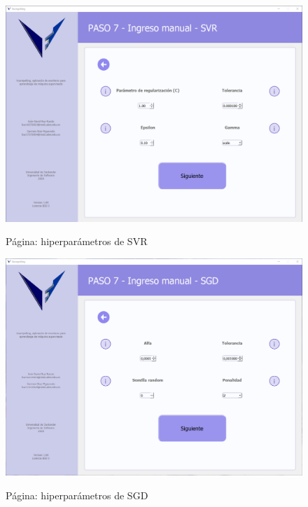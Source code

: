 \begin{figure}[H]
    \centering
    \caption{Página: hiperparámetros de SVR}
    \includegraphics[width=\textwidth]{views/svr.png}
    \label{fig:svr}
\end{figure}

\begin{figure}[H]
    \centering
    \caption{Página: hiperparámetros de SGD}
    \includegraphics[width=\textwidth]{views/sgd.png}
    \label{fig:sgd}
\end{figure}

